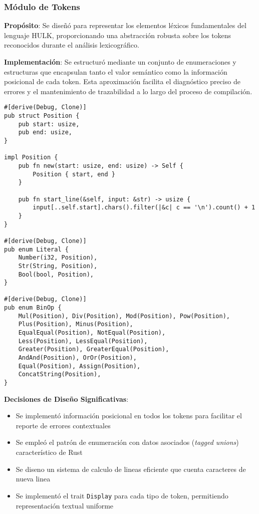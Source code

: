 \documentclass[12pt,a4paper]{article}
\begin{document}
\subsubsection{Módulo de Tokens}

\textbf{Propósito}: Se diseñó para representar los elementos léxicos fundamentales del lenguaje HULK, proporcionando una abstracción robusta sobre los tokens reconocidos durante el análisis lexicográfico.

\textbf{Implementación}: Se estructuró mediante un conjunto de enumeraciones y estructuras que encapsulan tanto el valor semántico como la información posicional de cada token. Esta aproximación facilita el diagnóstico preciso de errores y el mantenimiento de trazabilidad a lo largo del proceso de compilación.

\begin{lstlisting}[style=rustcode,caption=Definición de tokens fundamentales]
#[derive(Debug, Clone)]
pub struct Position {
    pub start: usize,
    pub end: usize,
}

impl Position {
    pub fn new(start: usize, end: usize) -> Self {
        Position { start, end }
    }

    pub fn start_line(&self, input: &str) -> usize {
        input[..self.start].chars().filter(|&c| c == '\n').count() + 1
    }
}

#[derive(Debug, Clone)]
pub enum Literal {
    Number(i32, Position),
    Str(String, Position),
    Bool(bool, Position),
}

#[derive(Debug, Clone)]
pub enum BinOp {
    Mul(Position), Div(Position), Mod(Position), Pow(Position),
    Plus(Position), Minus(Position),
    EqualEqual(Position), NotEqual(Position),
    Less(Position), LessEqual(Position),
    Greater(Position), GreaterEqual(Position),
    AndAnd(Position), OrOr(Position),
    Equal(Position), Assign(Position),
    ConcatString(Position),
}
\end{lstlisting}

\textbf{Decisiones de Diseño Significativas}:
\begin{itemize}
    \item Se implementó información posicional en todos los tokens para facilitar el reporte de errores contextuales
    \item Se empleó el patrón de enumeración con datos asociados (\textit{tagged unions}) característico de Rust
    \item Se diseno un sistema de calculo de lineas eficiente que cuenta caracteres de nueva linea
    \item Se implementó el trait \texttt{Display} para cada tipo de token, permitiendo representación textual uniforme
\end{itemize}
\end{document}
